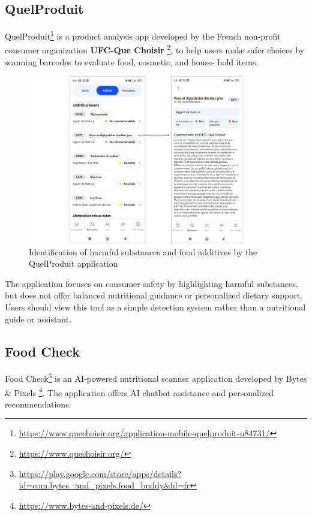 \subsection{QuelProduit}
\par QuelProduit\footnote{\url{https://www.quechoisir.org/application-mobile-quelproduit-n84731/}} is a product 
analysis app developed by the French non-profit consumer organization \textbf{UFC-Que Choisir} \footnote{\url{https://www.quechoisir.org/}}, to help users make
safer choices by scanning barcodes to evaluate food, cosmetic, and house-
hold items. 

 \begin{center}
\begin{figure}[H]
\includegraphics[scale=0.19]{images/quelproduit.jpg}
\caption{Identification of harmful substances and food additives by the QuelProduit application}
\label{fig:queChoisir}
\end{figure}
\end{center}

\par The application focuses on consumer safety by highlighting
harmful substances, but does not offer balanced nutritional guidance or
personalized dietary support. Users should view this tool as a simple
detection system rather than a nutritional guide or assistant.


 \subsection{Food Check}
Food Check\footnote{\url{https://play.google.com/store/apps/details?id=com.bytes_and_pixels.food_buddy&hl=fr}} is an AI-powered nutritional scanner application developed by 
Bytes \& Pixels \footnote{\url{https://www.bytes-and-pixels.de/}}. The application offers AI chatbot assistance and personalized recommendations.

